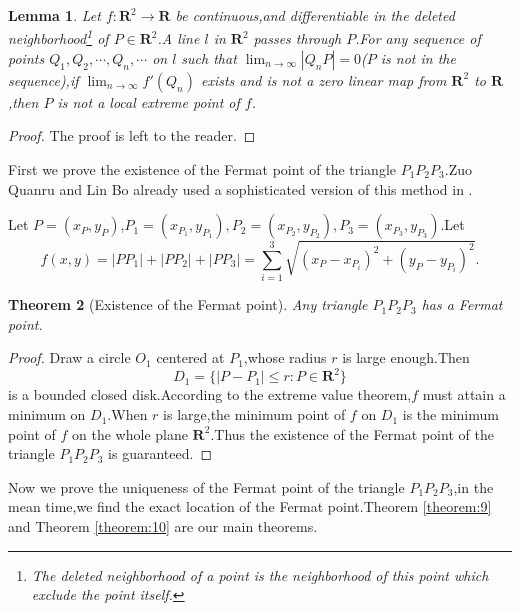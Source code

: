 \documentclass{amsart}
\theoremstyle{plain}
\newtheorem{theorem}{Theorem}
\newtheorem{lemma}[theorem]{Lemma}
\theoremstyle{definition}
\begin{document}
\begin{lemma}
  Let $f:\mathbf{R}^2\to \mathbf{R}$ be continuous,and differentiable
  in the deleted neighborhood\footnote{The deleted neighborhood of a
    point is the neighborhood of this point which exclude the point
    itself.} of $P\in \mathbf{R}^2$.A line $l$ in
  $\mathbf{R}^2$ passes through $P$.For any sequence of points $Q_1,Q_2,\cdots,Q_n,\cdots$ on
  $l$ such that $\lim_{n\to\infty}|Q_nP|=0$($P$ is not in the sequence),if
  $\lim_{n\to\infty} f'(Q_n)$ exists and is not a zero linear map from
  $\mathbf{R}^2$ to $\mathbf{R}$,then $P$ is not a local extreme point
  of $f$.
\end{lemma}
\begin{proof}
  The proof is left to the reader.
\end{proof}

First we prove the existence of the Fermat point of the triangle
$P_1P_2P_3$.Zuo Quanru and Lin Bo already used a
sophisticated version of this method in \cite{zuo}.

Let $P=(x_{P},y_{P})$,$P_1=(x_{P_{1}},y_{P_{1}}),P_2=(x_{P_{2}},y_{P_{2}}),P_3=(x_{P_{3}},y_{P_{3}})$.Let 
\begin{equation*}
  f(x,y)=|PP_1|+|PP_2|+|PP_3|=\sum_{i=1}^3\sqrt{(x_{P}-x_{P_{i}})^2+(y_{P}-y_{P_{i}})^2}.
\end{equation*}


\begin{theorem}[Existence of the Fermat point]\label{theorem:3}
  Any triangle $P_1P_2P_3$ has a Fermat point.
\end{theorem}
\begin{proof}
Draw a circle $O_1$ centered at $P_1$,whose radius $r$ is large
enough.Then $$D_{1}=\{|P-P_1|\leq r:P\in \mathbf{R}^2\}$$ is a bounded
closed disk.According to the extreme value theorem,$f$ must
attain a minimum on $D_1$.When $r$ is large,the minimum point of $f$ on
$D_1$ is the minimum point of $f$ on the whole plane $\mathbf{R}^2$.Thus the existence of the Fermat
point of the triangle $P_1P_2P_3$ is guaranteed.
\end{proof}





Now we prove the uniqueness of the Fermat point of the triangle
$P_1P_2P_3$,in the mean time,we find the exact
location of the Fermat point.Theorem \eqref{theorem:9}  and Theorem
\eqref{theorem:10} are our main theorems.
\end{document}
